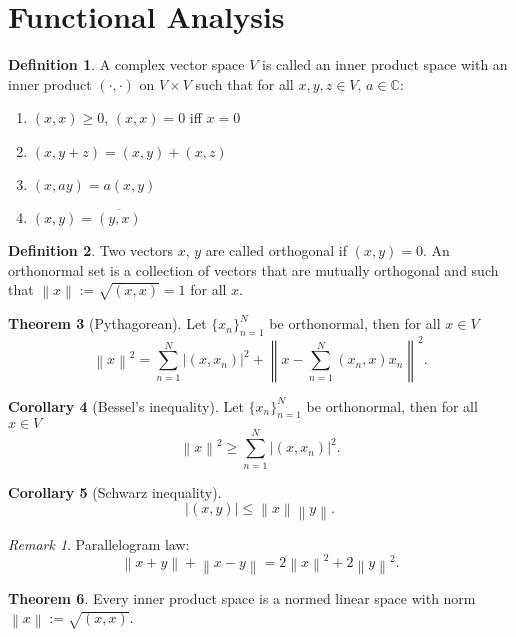 \documentclass[twocolumn]{article}
\theoremstyle{definition}
\newtheorem{definition}{Definition}[section]
\newtheorem{theorem}[definition]{Theorem}
\newtheorem{corollary}[definition]{Corollary}
\theoremstyle{remark}
\newtheorem*{remark}{Remark}
\begin{document}
\section{Functional Analysis}

\begin{definition}
    A complex vector space $V$ is called an inner product space with an inner product
    $(\cdot, \cdot)$ on $V \times V$ such that for all $x, y, z \in V,\, a \in \mathbb{C}$:
    \begin{enumerate}[noitemsep]
        \item $(x, x) \geq 0$, $(x, x) = 0$ iff $x = 0$
        \item $(x, y + z) = (x, y) + (x, z)$
        \item $(x, ay) = a(x, y)$
        \item $(x, y) = \overline{(y, x)}$
    \end{enumerate}
\end{definition}
\begin{definition}
    Two vectors $x$, $y$ are called orthogonal if $(x, y) = 0$. An orthonormal set is a collection
    of vectors that are mutually orthogonal and such that $\left\lVert x \right\rVert := \sqrt{(x, x)} = 1$ for all $x$.
\end{definition}
\begin{theorem}[Pythagorean]
    Let $\{x_n \}_{n=1}^N$ be orthonormal, then for all $x \in V$
    \begin{equation}
        \left\lVert x\right\rVert^2 = \sum_{n=1}^N \left\lvert (x, x_n)\right\rvert^2 + \left\lVert x - \sum_{n=1}^N (x_n, x)x_n\right\rVert^2.
    \end{equation}
\end{theorem}
\begin{corollary}[Bessel's inequality]
    Let $\{x_n \}_{n=1}^N$ be orthonormal, then for all $x \in V$
    \begin{equation}
        \left\lVert x\right\rVert^2 \geq \sum_{n=1}^N \left\lvert (x, x_n)\right\rvert^2.
    \end{equation}
\end{corollary}
\begin{corollary}[Schwarz inequality]
    \begin{equation}
        \left\lvert (x, y)\right\rvert \leq \left\lVert x\right\rVert \left\lVert y\right\rVert.
    \end{equation}
\end{corollary}
\begin{remark}
    Parallelogram law:
    \begin{equation}
        \left\lVert x + y\right\rVert + \left\lVert x - y\right\rVert = 2 \left\lVert x\right\rVert ^2 + 2 \left\lVert y\right\rVert ^2.
    \end{equation}
\end{remark}
\begin{theorem}
    Every inner product space is a normed linear space with norm $\left\lVert x \right\rVert := \sqrt{(x, x)}$.
\end{theorem}
\end{document}
